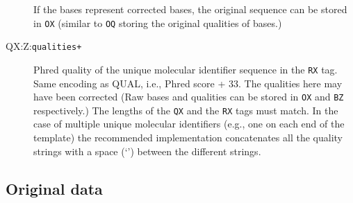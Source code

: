 \documentclass[10pt]{article}
\newcommand{\tagvalue}[1]{{\tt #1}}
\begin{document}
\begin{description}
If the bases represent corrected bases, the original sequence can be stored in {\tt OX} (similar to {\tt OQ} storing the original qualities of bases.)

\item[QX:Z:\tagvalue{qualities+}]
Phred quality of the unique molecular identifier sequence in the {\tt RX} tag.
Same encoding as {\sf QUAL}, i.e., Phred score + 33.
The qualities here may have been corrected (Raw bases and qualities can be stored in {\tt OX} and {\tt BZ} respectively.)
The lengths of the {\tt QX} and the {\tt RX} tags must match.
In the case of multiple unique molecular identifiers (e.g., one on each end of the template) the recommended implementation concatenates all the quality strings with a space (`{\tt \textvisiblespace}') between the different strings.
\end{description}

\subsection{Original data}
\end{document}
